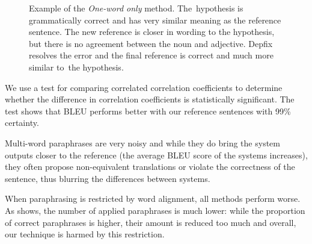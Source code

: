 \begin{figure}[t]
\begin{center}
\begin{tabular}{ll}
\end{tabular}
\caption{Example of the \textit{One-word only} method. The~hypothesis is 
grammatically  correct and has very similar meaning as the reference sentence. 
The new reference is closer in wording to the hypothesis, but there is no 
agreement between the noun and adjective. Depfix resolves the error and the 
final reference is correct and much more similar to~the hypothesis.}
\label{example}
\end{center}
\end{figure}

We use a test for comparing correlated correlation coefficients 
\citep{meng1992comparing} to determine whether the difference in correlation
coefficients is statistically significant. The test shows that BLEU performs
better with our reference sentences with 99\% certainty. 

Multi-word paraphrases are very noisy and while they do bring the system 
outputs closer to the reference (the average BLEU score of the systems 
increases), they often propose non-equivalent translations or violate the 
correctness of the sentence, thus blurring the differences between systems.

When paraphrasing is restricted by word alignment, all methods perform worse. 
As  shows, the number of applied paraphrases is much
lower: while the proportion of correct paraphrases is higher, their amount is 
reduced too much and overall, our technique is harmed by this restriction. 

